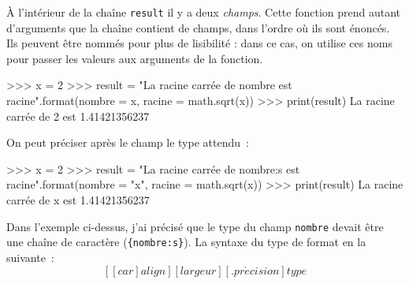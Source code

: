 À l'intérieur de la chaîne \texttt{result} il y a deux \textit{champs}. Cette fonction prend autant d'arguments que la chaîne contient de champs, dans l'ordre où ils sont énoncés. Ils peuvent être nommés pour plus de lisibilité : dans ce cas, on utilise ces noms pour passer les valeurs aux arguments de la fonction.
\begin{pythoncode}
>>> x = 2
>>> result = "La racine carrée de {nombre} est {racine}".format(nombre = x, racine = math.sqrt(x))
>>> print(result)
La racine carrée de 2 est 1.41421356237
\end{pythoncode}

On peut préciser après le champ le type attendu~:
\begin{pythoncode}
>>> x = 2
>>> result = "La racine carrée de {nombre:s} est {racine}".format(nombre = "x", racine = math.sqrt(x))
>>> print(result)
La racine carrée de x est 1.41421356237
\end{pythoncode}
Dans l'exemple ci-dessus, j'ai précisé que le type du champ \texttt{nombre} devait être une chaîne de caractère (\texttt{\{nombre:s\}}). La syntaxe du type de format en la suivante~:
\[[[car]align][largeur][.pr\acute{e}cision]type\]

